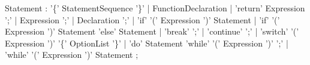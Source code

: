 \documentclass[a4paper, 11.5pt]{article}
\begin{document}
\begin{center}
    \begin{rail}
      Statement : '\{' StatementSequence '\}'
                | FunctionDeclaration
                | 'return' Expression ';'
                | Expression ';'
                | Declaration ';'
                | 'if' '(' Expression ')' Statement
                | 'if' '(' Expression ')' Statement 'else' Statement
                | 'break' ';'
                | 'continue' ';'
                | 'switch' '(' Expression ')' '\{' OptionList '\}'
                | 'do' Statement 'while' '(' Expression ')' ';'
                | 'while' '(' Expression ')' Statement
                ;      
    \end{rail}
\end{center}
  
\end{document}
